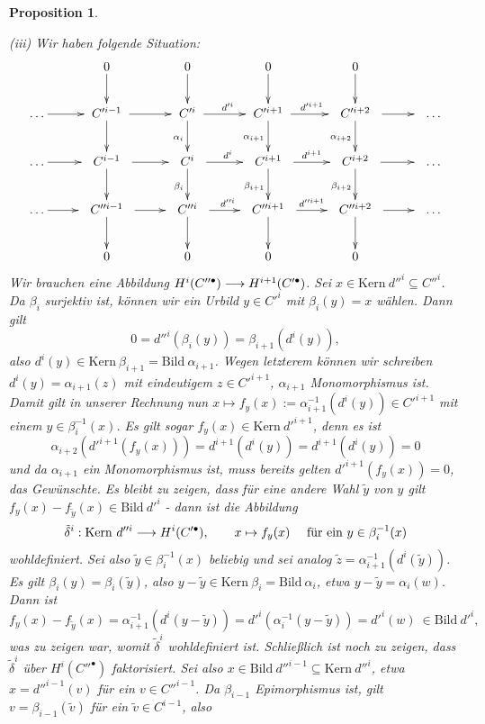 \documentclass[11pt]{book}
\newtheorem{proposition}[theorem]{Proposition}
\theoremstyle{nonumberbreak}
\newenvironment{pr}[1][]{\ifthenelse{\equal{#1}{}}{\proof}{\proof[#1]}\rm}{\endproof}
\newcommand{\bild}{\mathrm{Bild}\ }
\newcommand{\kernel}{\mathrm{Kern}\ }
\begin{document}
\begin{spacing}{1.4}
\begin{proposition}
\begin{pr}
\begin{compactenum}
\item[(iii)] Wir haben folgende Situation:
$$
\begin{xy}
\xymatrix{
& 0 \ar[d] & 0 \ar[d] & 0 \ar[d] & 0 \ar[d] & \\
\ldots \ar[r] & \ C'^{i-1}\  \ar[d] \ar[r] & \ C'^{i}\  \ar[d]_{\alpha_i} \ar[r]^{d'^{i}} &  \ C'^{i+1} \ \ar[d]_{\alpha_{i+1}} \ar[r]^{d'^{i+1}} & \ \ C'^{i+2}\ \ \ar[d]_{\alpha_{i+2}} \ar[r] &\ \ \ldots \\
\ldots \ar[r] &\ \ C^{i-1}\ \ \ar[d] \ar[r] & \ \ C^{i}\ \  \ar[d]_{\beta_i} \ar[r]^{d^{i}} & \ \ C^{i+1}\ \ \ar[d]_{\beta_{i+1}} \ar[r]^{d^{i+1}} & \ \ C^{i+2}\ \  \ar[d]_{\beta_{i+2}} \ar[r] & \ \ \ldots \\
\ldots \ar[r] & \ \ C''^{i-1} \ \ \ar[d] \ar[r] &\ \  C''^{i}\ \  \ar[d] \ar[r]^{d''^{i}} & \ \ C''^{i+1} \ \ \ar[d] \ar[r]^{d''^{i+1}} & \ \ C''^{i+2} \ \ \ar[d] \ar[r]& \ \ \ldots \\
& 0 & 0 & 0 & 0 &
}
\end{xy}
$$
Wir brauchen eine Abbildung $H^{i}(C''^{\bullet}) \longrightarrow H^{i+1}(C'^{\bullet})$. Sei $x \in \kernel d''^{i} \subseteq C''^{i}$. Da $\beta_i$ surjektiv ist, können wir ein Urbild $y \in C'^{i}$ mit $\beta_i(y)=x$ wählen. Dann gilt
$$0= d''^{i}(\beta_i(y)) = \beta_{i+1}(d^{i}(y)),$$
also $d^{i}(y) \in \kernel \beta_{i+1} = \bild \alpha_{i+1}$. Wegen letzterem können wir schreiben $d^{i}(y) =\alpha_{i+1}(z)$ mit eindeutigem $z \in C'^{i+1}$, $\alpha_{i+1}$ Monomorphismus ist. Damit gilt in unserer Rechnung nun $x \mapsto f_y(x):=\alpha_{i+1}^{-1}(d^{i}(y)) \in C'^{i+1}$ mit einem $y \in \beta_i^{-1}(x)$. Es gilt sogar $f_y(x) \in \kernel d'^{i+1}$, denn es ist 
$$\alpha_{i+2}(d'^{i+1}(f_y(x))) = d^{i+1}( d^{i}(y)) = d^{i+1}(d^{i}(y)) = 0$$
und da $\alpha_{i+1}$ ein Monomorphismus ist, muss bereits gelten $d'^{i+1}(f_y(x))=0$, das Gewünschte. Es bleibt zu zeigen, dass für eine andere Wahl $\tilde{y}$ von $y$ gilt $f_y(x)- f_{\tilde{y}}(x) \in \bild d'^{i}$ - dann ist die Abbildung
$$\tilde{\delta}^{i}: \kernel d''^{i} \la H^{i}(C'^{\bullet}), \qquad x \mapsto f_y(x) \quad \textrm{ für ein } y \in \beta_i^{-1}(x)$$
wohldefiniert. Sei also $\tilde{y} \in \beta_i^{-1}(x)$ beliebig und sei analog $\tilde{z} = \alpha_{i+1}^{-1}(d^{i}(\tilde{y}))$. Es gilt $\beta_i(y) = \beta_i(\tilde{y})$, also $y - \tilde{y} \in \kernel \beta_i = \bild \alpha_i$, etwa $y-\tilde{y} = \alpha_i(w)$. Dann ist
$$f_y(x) - f_{\tilde{y}}(x) = \alpha_{i+1}^{-1}(d^{i}(y - \tilde{y})) = d'^{i}(\alpha_i^{-1}(y-\tilde{y})) = d'^{i}(w) \ \in \bild d'^{i},$$
was zu zeigen war, womit $\tilde{\delta}^{i}$ wohldefiniert ist. Schließlich ist noch zu zeigen, dass $\tilde{\delta}^{i}$ über $H^{i}(C''^{\bullet})$ faktorisiert. Sei also $x \in \bild d''^{i-1} \subseteq \kernel d''^{i}$, etwa $x= d''^{i-1}(v)$ für ein $v \in C''^{i-1}$. Da $\beta_{i-1}$ Epimorphismus ist, gilt $v= \beta_{i-1}(\tilde{v})$ für ein $\tilde{v} \in C^{i-1}$, also

\end{compactenum}
\end{pr}
\end{proposition}
\end{spacing}
\end{document}
